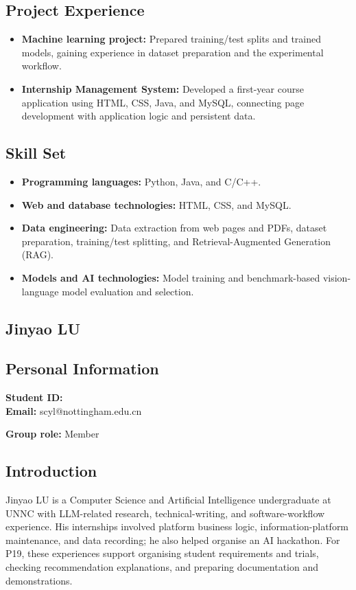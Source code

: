 \documentclass[a4paper,12pt]{article}
\newcommand{\PersonalInformation}[2]{%
  \subsection*{Personal Information}
  \if\relax\detokenize{#1}\relax\else
  \noindent\textbf{Student ID:} #1\\
  \fi
  \textbf{Email:} #2\par
}
\begin{document}
\subsection*{Project Experience}
\begin{itemize}
  \item \textbf{Machine learning project:} Prepared training/test splits and trained models, gaining experience in dataset preparation and the experimental workflow.
  \item \textbf{Internship Management System:} Developed a first-year course application using HTML, CSS, Java, and MySQL, connecting page development with application logic and persistent data.
\end{itemize}

\subsection*{Skill Set}
\begin{itemize}
  \item \textbf{Programming languages:} Python, Java, and C/C++.
  \item \textbf{Web and database technologies:} HTML, CSS, and MySQL.
  \item \textbf{Data engineering:} Data extraction from web pages and PDFs, dataset preparation, training/test splitting, and Retrieval-Augmented Generation (RAG).
  \item \textbf{Models and AI technologies:} Model training and benchmark-based vision-language model evaluation and selection.
\end{itemize}

\subsection{Jinyao LU}
\PersonalInformation{}{scyl@nottingham.edu.cn}
\noindent\textbf{Group role:} Member\par

\subsection*{Introduction}
Jinyao LU is a Computer Science and Artificial Intelligence undergraduate at UNNC with LLM-related research, technical-writing, and software-workflow experience. His internships involved platform business logic, information-platform maintenance, and data recording; he also helped organise an AI hackathon. For P19, these experiences support organising student requirements and trials, checking recommendation explanations, and preparing documentation and demonstrations.
\end{document}
